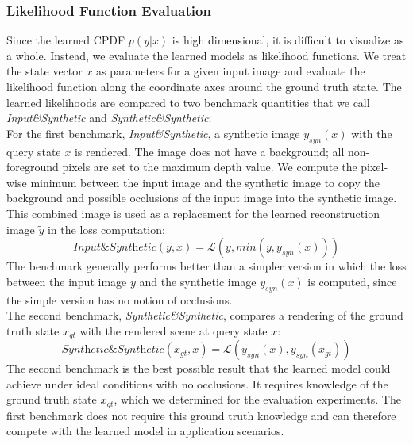 \documentclass[letterpaper, 10 pt, journal, twoside]{ieeetran}  %
\begin{document}
\subsubsection*{Likelihood Function Evaluation}
Since the learned CPDF $p(y|x)$ is high dimensional, it is difficult to visualize as a whole.
Instead, we evaluate the learned models as likelihood functions. We treat the state vector $x$ as parameters for a given input image and evaluate the likelihood function along the coordinate axes around the ground truth state.
The learned likelihoods are compared to two benchmark quantities that we call \textit{Input\&Synthetic} and \textit{Synthetic\&Synthetic}:\\
For the first benchmark, \textit{Input\&Synthetic}, a synthetic image $y_{syn}(x)$ with the query state $x$ is rendered. The image does not have a background; all non-foreground pixels are set to the maximum depth value.
We compute the pixel-wise minimum between the input image and the synthetic image to copy the background and possible occlusions of the input image into the synthetic image.
This combined image is used as a replacement for the learned reconstruction image $\tilde{y}$ in the loss computation:
\begin{equation}
    \textit{Input\&Synthetic}(y, x) = \mathcal{L}(y, min(y, y_{syn}(x)))
\end{equation}
The benchmark generally performs better than a simpler version in which the loss between the input image $y$ and the synthetic image $y_{syn}(x)$ is computed, since the simple version has no notion of occlusions.\\
The second benchmark, \textit{Synthetic\&Synthetic}, compares a rendering of the ground truth state $x_{gt}$ with the rendered scene at query state $x$:
\begin{equation}
    \textit{Synthetic\&Synthetic}(x_{gt}, x) = \mathcal{L}(y_{syn}(x), y_{syn}(x_{gt}))
\end{equation}
The second benchmark is the best possible result that the learned model could achieve under ideal conditions with no occlusions. It requires knowledge of the ground truth state $x_{gt}$, which we determined for the evaluation experiments.
The first benchmark does not require this ground truth knowledge and can therefore compete with the learned model in application scenarios.
\end{document}
